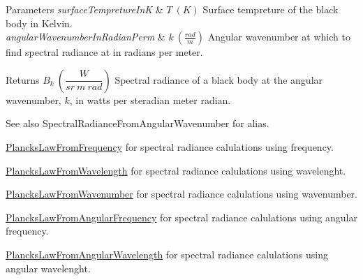 \begin{DoxyParams}{Parameters}
{\em surface\+Tempreture\+InK} & $T\ (K)$ Surface tempreture of the black body in Kelvin. \\
\hline
{\em angular\+Wavenumber\+In\+Radian\+Perm} & $k\ (\frac{rad}{m})$ Angular wavenumber at which to find spectral radiance at in radians per meter. \\
\hline
\end{DoxyParams}
\begin{DoxyReturn}{Returns}
$B_{k}\ ( \dfrac{W}{sr\ m\ rad})$ Spectral radiance of a black body at the angular wavenumber, $k$, in watts per steradian meter radian. 
\end{DoxyReturn}
\begin{DoxySeeAlso}{See also}
Spectral\+Radiance\+From\+Angular\+Wavenumber for alias. 

\mbox{\hyperlink{group___e_g_x_phys-_electrodynamics-_black_body-_plancks_law_ga68aae82f8a086831358c4a61c8c80ba4}{Plancks\+Law\+From\+Frequency}} for spectral radiance calulations using frequency. 

\mbox{\hyperlink{group___e_g_x_phys-_electrodynamics-_black_body-_plancks_law_ga54639bc031ded51ef78aa82b0457a4dd}{Plancks\+Law\+From\+Wavelength}} for spectral radiance calulations using wavelenght. 

\mbox{\hyperlink{group___e_g_x_phys-_electrodynamics-_black_body-_plancks_law_ga6648ae2a0fbff6735c1e1a04c7cac746}{Plancks\+Law\+From\+Wavenumber}} for spectral radiance calulations using wavenumber. 

\mbox{\hyperlink{group___e_g_x_phys-_electrodynamics-_black_body-_plancks_law_gaac540560c71e30c02b91d22e417b5863}{Plancks\+Law\+From\+Angular\+Frequency}} for spectral radiance calulations using angular frequency. 

\mbox{\hyperlink{group___e_g_x_phys-_electrodynamics-_black_body-_plancks_law_ga7322124727f968d28807e918c5eeb23f}{Plancks\+Law\+From\+Angular\+Wavelength}} for spectral radiance calulations using angular wavelenght. 
\end{DoxySeeAlso}
\mbox{\label{group___e_g_x_phys-_electrodynamics-_black_body-_plancks_law_ga68aae82f8a086831358c4a61c8c80ba4}} 
